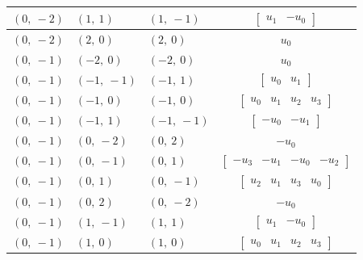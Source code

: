 \documentclass[11pt]{article}
\theoremstyle{definition}
\begin{document}
\begin{longtable}{|l|l|l|c|}
    \hline
    $\left( 0, \  -2\right)$ & $\left( 1, \  1\right)$ & $\left( 1, \  -1\right)$ & $\left[\begin{matrix}u_{1} & - u_{0}\end{matrix}\right]$ \\
    \hline
    $\left( 0, \  -2\right)$ & $\left( 2, \  0\right)$ & $\left( 2, \  0\right)$ & $u_{0}$ \\
    \hline
    $\left( 0, \  -1\right)$ & $\left( -2, \  0\right)$ & $\left( -2, \  0\right)$ & $u_{0}$ \\
    \hline
    $\left( 0, \  -1\right)$ & $\left( -1, \  -1\right)$ & $\left( -1, \  1\right)$ & $\left[\begin{matrix}u_{0} & u_{1}\end{matrix}\right]$ \\
    \hline
    $\left( 0, \  -1\right)$ & $\left( -1, \  0\right)$ & $\left( -1, \  0\right)$ & $\left[\begin{matrix}u_{0} & u_{1} & u_{2} & u_{3}\end{matrix}\right]$ \\
    \hline
    $\left( 0, \  -1\right)$ & $\left( -1, \  1\right)$ & $\left( -1, \  -1\right)$ & $\left[\begin{matrix}- u_{0} & - u_{1}\end{matrix}\right]$ \\
    \hline
    $\left( 0, \  -1\right)$ & $\left( 0, \  -2\right)$ & $\left( 0, \  2\right)$ & $- u_{0}$ \\
    \hline
    $\left( 0, \  -1\right)$ & $\left( 0, \  -1\right)$ & $\left( 0, \  1\right)$ & $\left[\begin{matrix}- u_{3} & - u_{1} & - u_{0} & - u_{2}\end{matrix}\right]$ \\
    \hline
    $\left( 0, \  -1\right)$ & $\left( 0, \  1\right)$ & $\left( 0, \  -1\right)$ & $\left[\begin{matrix}u_{2} & u_{1} & u_{3} & u_{0}\end{matrix}\right]$ \\
    \hline
    $\left( 0, \  -1\right)$ & $\left( 0, \  2\right)$ & $\left( 0, \  -2\right)$ & $- u_{0}$ \\
    \hline
    $\left( 0, \  -1\right)$ & $\left( 1, \  -1\right)$ & $\left( 1, \  1\right)$ & $\left[\begin{matrix}u_{1} & - u_{0}\end{matrix}\right]$ \\
    \hline
    $\left( 0, \  -1\right)$ & $\left( 1, \  0\right)$ & $\left( 1, \  0\right)$ & $\left[\begin{matrix}u_{0} & u_{1} & u_{2} & u_{3}\end{matrix}\right]$ \\

\end{longtable}
\end{document}
